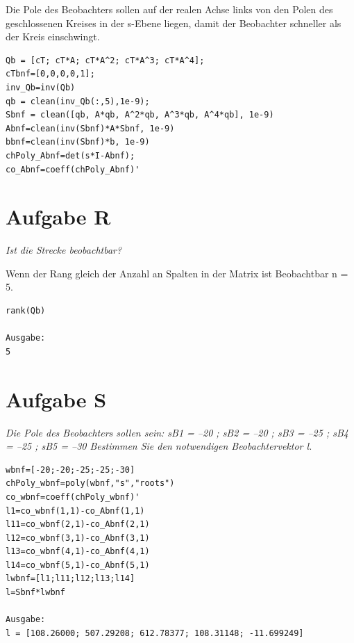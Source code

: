 \noindent Die Pole des Beobachters sollen auf der realen Achse links von den Polen des geschlossenen Kreises in der s-Ebene liegen, damit der Beobachter schneller als der Kreis einschwingt.

\begin{lstlisting}[caption = Transformation zur BNF, captionpos = b, label = lst:example]
Qb = [cT; cT*A; cT*A^2; cT*A^3; cT*A^4];
cTbnf=[0,0,0,0,1];
inv_Qb=inv(Qb)
qb = clean(inv_Qb(:,5),1e-9);
Sbnf = clean([qb, A*qb, A^2*qb, A^3*qb, A^4*qb], 1e-9)  
Abnf=clean(inv(Sbnf)*A*Sbnf, 1e-9)
bbnf=clean(inv(Sbnf)*b, 1e-9)
chPoly_Abnf=det(s*I-Abnf);                     
co_Abnf=coeff(chPoly_Abnf)'
\end{lstlisting}





\section{Aufgabe R}
\textit{Ist die Strecke beobachtbar?}


\noindent Wenn der Rang gleich der Anzahl an Spalten in der Matrix ist Beobachtbar n = 5.
\begin{lstlisting}[caption = Prüfung der Beobachtbarkeit, captionpos = b, label = lst:example]
rank(Qb)

Ausgabe:
5
\end{lstlisting}






\section{Aufgabe S}
\textit{Die Pole des Beobachters sollen sein: sB1 = –20 ; sB2 = –20 ; sB3 = –25 ; sB4 = –25 ; sB5 = –30 Bestimmen Sie den notwendigen Beobachtervektor l.}
 
\begin{lstlisting}[caption = Polvorgabe BNF, captionpos = b, label = lst:example]
wbnf=[-20;-20;-25;-25;-30]             
chPoly_wbnf=poly(wbnf,"s","roots")              
co_wbnf=coeff(chPoly_wbnf)'                     
l1=co_wbnf(1,1)-co_Abnf(1,1)                         
l11=co_wbnf(2,1)-co_Abnf(2,1)
l12=co_wbnf(3,1)-co_Abnf(3,1)
l13=co_wbnf(4,1)-co_Abnf(4,1)
l14=co_wbnf(5,1)-co_Abnf(5,1)
lwbnf=[l1;l11;l12;l13;l14]                          
l=Sbnf*lwbnf

Ausgabe:
l = [108.26000; 507.29208; 612.78377; 108.31148; -11.699249]
\end{lstlisting}






